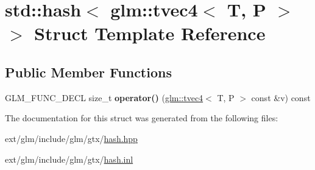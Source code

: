 \hypertarget{structstd_1_1hash_3_01glm_1_1tvec4_3_01_t_00_01_p_01_4_01_4}{\section{std\-:\-:hash$<$ glm\-:\-:tvec4$<$ T, P $>$ $>$ Struct Template Reference}
\label{structstd_1_1hash_3_01glm_1_1tvec4_3_01_t_00_01_p_01_4_01_4}
}
\subsection*{Public Member Functions}
\begin{DoxyCompactItemize}
\item 
\hypertarget{structstd_1_1hash_3_01glm_1_1tvec4_3_01_t_00_01_p_01_4_01_4_a9c8811c756d5e38813a9b869d232fdb8}{G\-L\-M\-\_\-\-F\-U\-N\-C\-\_\-\-D\-E\-C\-L size\-\_\-t {\bfseries operator()} (\hyperlink{structglm_1_1tvec4}{glm\-::tvec4}$<$ T, P $>$ const \&v) const }\label{structstd_1_1hash_3_01glm_1_1tvec4_3_01_t_00_01_p_01_4_01_4_a9c8811c756d5e38813a9b869d232fdb8}

\end{DoxyCompactItemize}


The documentation for this struct was generated from the following files\-:\begin{DoxyCompactItemize}
\item 
ext/glm/include/glm/gtx/\hyperlink{hash_8hpp}{hash.\-hpp}\item 
ext/glm/include/glm/gtx/\hyperlink{hash_8inl}{hash.\-inl}\end{DoxyCompactItemize}
